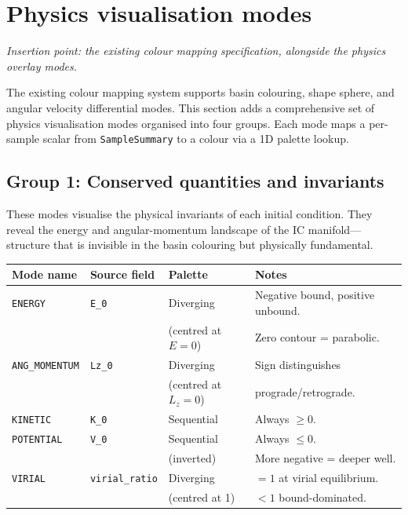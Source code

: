 \documentclass[11pt]{article}
\newcommand{\field}[1]{\texttt{#1}}
\newcommand{\struct}[1]{\texttt{#1}}
\begin{document}
\section{Physics visualisation modes}
\label{sec:colour}

\textit{Insertion point: the existing colour mapping specification, alongside
the physics overlay modes.}

The existing colour mapping system supports basin colouring, shape sphere,
and angular velocity differential modes. This section adds a comprehensive
set of physics visualisation modes organised into four groups. Each mode maps
a per-sample scalar from \struct{SampleSummary} to a colour via a 1D palette
lookup.

\subsection{Group 1: Conserved quantities and invariants}

These modes visualise the physical invariants of each initial condition. They
reveal the energy and angular-momentum landscape of the IC manifold---structure
that is invisible in the basin colouring but physically fundamental.

\begin{center}
\begin{tabular}{llll}
\toprule
Mode name & Source field & Palette & Notes \\
\midrule
\texttt{ENERGY} & \field{E\_0} & Diverging & Negative bound,
    positive unbound. \\
 & & (centred at $E=0$) & Zero contour = parabolic. \\
\texttt{ANG\_MOMENTUM} & \field{Lz\_0} & Diverging & Sign distinguishes \\
 & & (centred at $L_z=0$) & prograde/retrograde. \\
\texttt{KINETIC} & \field{K\_0} & Sequential & Always $\geq 0$. \\
\texttt{POTENTIAL} & \field{V\_0} & Sequential & Always $\leq 0$. \\
 & & (inverted) & More negative = deeper well. \\
\texttt{VIRIAL} & \field{virial\_ratio} & Diverging & $= 1$ at virial equilibrium. \\
 & & (centred at 1) & $< 1$ bound-dominated. \\
\bottomrule
\end{tabular}
\end{center}
\end{document}
